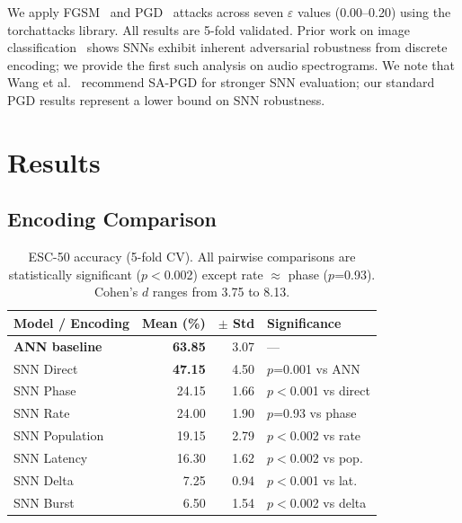 \documentclass[sigconf,nonacm=false]{acmart}
\begin{document}
We apply FGSM~\cite{goodfellow2015} and PGD~\cite{madry2018} attacks across seven $\varepsilon$ values (0.00--0.20) using the torchattacks library. All results are 5-fold validated. Prior work on image classification~\cite{sharmin2020} shows SNNs exhibit inherent adversarial robustness from discrete encoding; we provide the first such analysis on audio spectrograms. We note that Wang et al.~\cite{wang2025} recommend SA-PGD for stronger SNN evaluation; our standard PGD results represent a lower bound on SNN robustness.

\section{Results}
\label{sec:results}

\subsection{Encoding Comparison}

\begin{table}[t]
\caption{ESC-50 accuracy (5-fold CV). All pairwise comparisons are statistically significant ($p<$0.002) except rate $\approx$ phase ($p$=0.93). Cohen's $d$ ranges from 3.75 to 8.13.}
\label{tab:encoding_results}
\small
\begin{tabular}{@{}lrrl@{}}
\toprule
Model / Encoding & Mean (\%) & $\pm$ Std & Significance \\
\midrule
\textbf{ANN baseline} & \textbf{63.85} & 3.07 & --- \\
\midrule
SNN Direct & \textbf{47.15} & 4.50 & $p$=0.001 vs ANN \\
SNN Phase & 24.15 & 1.66 & $p<$0.001 vs direct \\
SNN Rate & 24.00 & 1.90 & $p$=0.93 vs phase \\
SNN Population & 19.15 & 2.79 & $p<$0.002 vs rate \\
SNN Latency & 16.30 & 1.62 & $p<$0.002 vs pop. \\
SNN Delta & 7.25 & 0.94 & $p<$0.001 vs lat. \\
SNN Burst & 6.50 & 1.54 & $p<$0.002 vs delta \\
\bottomrule
\end{tabular}
\end{table}
\end{document}
